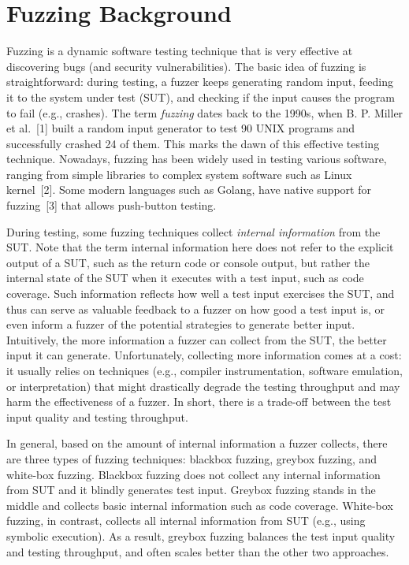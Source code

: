 \documentclass[letterpaper,11pt]{article}
\begin{document}
\section{Fuzzing Background}

Fuzzing is a dynamic software testing technique that is very effective at discovering bugs (and security vulnerabilities).
The basic idea of fuzzing is straightforward: during testing, a fuzzer keeps
generating random input, feeding it to the system under test (SUT), and checking
if the input causes the program to fail (e.g., crashes).
The term \textit{fuzzing} dates back to the 1990s, when B. P. Miller et al.~[1] built a random input generator to test 90 UNIX programs and successfully crashed 24 of them.
This marks the dawn of this effective testing technique.
Nowadays, fuzzing has been widely used in testing various software, ranging from simple libraries to complex system software such as Linux kernel~[2].
Some modern languages such as Golang, have native support for fuzzing~[3] that allows push-button testing.

During testing, some fuzzing techniques collect \textit{internal information} from the SUT.
Note that the term internal information here does not refer to the explicit output of a SUT, such as the return code or console output, but rather the internal state of the SUT when it executes with a test input, such as code coverage.
Such information reflects how well a test input exercises the SUT, and thus can serve as valuable feedback to a fuzzer on how good a test input is, or even inform a fuzzer of the potential strategies to generate better input.
Intuitively, the more information a fuzzer can collect from the SUT, the better input it can generate.
Unfortunately, collecting more information comes at a cost: it usually relies on
techniques (e.g., compiler instrumentation, software emulation, or
interpretation) that might drastically degrade the testing throughput and may
harm the effectiveness of a fuzzer. In short, there is a trade-off between the
test input quality and testing throughput.

In general, based on the amount of internal information a fuzzer collects, there are three types of fuzzing techniques: blackbox fuzzing, greybox fuzzing, and white-box fuzzing.
Blackbox fuzzing does not collect any internal information from SUT and it blindly generates test input.
Greybox fuzzing stands in the middle and collects basic internal information such as code coverage.
White-box fuzzing, in contrast, collects all internal information from SUT (e.g., using symbolic execution).
As a result, greybox fuzzing balances the test input quality and testing throughput, and often scales better than the other two approaches.
\end{document}
